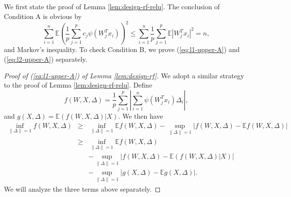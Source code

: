 We first state the proof of Lemma \ref{lem:design-rf-relu}. 
The conclusion of Condition A is obvious by
$$\sum_{i=1}^n\mathbb{E}\left(\frac{1}{p}\sum_{j=1}^pc_j\psi(W_j^Tx_i)\right)^2\leq \sum_{i=1}^n\frac{1}{p}\sum_{j=1}^p\mathbb{E}|W_j^Tx_i|^2= n,$$
and Markov's inequality. To check Condition B, we prove (\ref{eq:l1-upper-A}) and (\ref{eq:l2-upper-A}) separately.
\begin{proof}[Proof of (\ref{eq:l1-upper-A}) of Lemma \ref{lem:design-rf}]
We adopt a similar strategy to the proof of Lemma \ref{lem:design-rf-relu}. Define
$$f(W,X,\Delta)=\frac{1}{p}\sum_{j=1}^p\left|\sum_{i=1}^n\psi(W_j^Tx_i)\Delta_i\right|,$$
and $g(X,\Delta)=\mathbb{E}(f(W,X,\Delta)|X)$.
We then have
\begin{eqnarray}
\nonumber \inf_{\|\Delta\|=1}f(W,X,\Delta) &\geq& \inf_{\|\Delta\|=1}\mathbb{E}f(W,X,\Delta) - \sup_{\|\Delta\|=1}\left|f(W,X,\Delta)-\mathbb{E}f(W,X,\Delta)\right| \\
\label{eq:exp-f-inf} &\geq& \inf_{\|\Delta\|=1}\mathbb{E}f(W,X,\Delta) \\
\label{eq:ep-f} && - \sup_{\|\Delta\|=1}\left|f(W,X,\Delta)-\mathbb{E}(f(W,X,\Delta)|X)\right| \\
\label{eq:ep-g} && - \sup_{\|\Delta\|=1}\left|g(X,\Delta)-\mathbb{\mathbb{E}}g(X,\Delta)\right|.
\end{eqnarray}
We will analyze the three terms above separately.


\end{proof}
